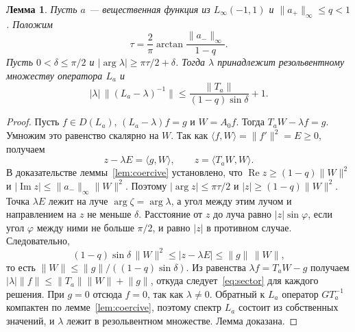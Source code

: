 \documentclass[12pt,a4paper]{article}
\newtheorem{lemma}{Лемма}
\theoremstyle{definition}
\newcommand{\norm}[1]{\lVert#1\rVert}
\newcommand{\abs}[1]{\lvert#1\rvert}
\newcommand{\inner}[2]{\langle#1,#2\rangle}
\begin{document}
\begin{lemma}\label{lem:sector}
Пусть $a$ --- вещественная функция из $L_\infty(-1,1)$ и $\norm{a_+}_\infty\le q<1$.
Положим
\[
 \tau=\frac2\pi\arctan\frac{\norm{a_-}_\infty}{1-q}.
\]
Пусть $0<\delta\le\pi/2$ и $\abs{\arg\lambda}\ge\pi\tau/2+\delta$. Тогда $\lambda$
принадлежит резольвентному множеству оператора $L_a$ и
\begin{equation}\label{eq:sector}
 \abs\lambda\,\norm{(L_a-\lambda)^{-1}}\le\frac{\norm{T_a}}{(1-q)\sin\delta}+1 .
\end{equation}
\end{lemma}
\begin{proof}
Пусть $f\in D(L_a)$, $(L_a-\lambda)f=g$ и $W=A_0f$. Тогда $T_aW-\lambda f=g$. Умножим это
равенство скалярно на $W$. Так как $\inner fW=\norm{f'}^2=E\ge0$, получаем
\[
 z-\lambda E=\inner gW,\qquad z=\inner{T_aW}{W}.
\]
В доказательстве леммы~\ref{lem:coercive} установлено, что
$\operatorname{Re}z\ge(1-q)\norm W^2$ и
$\abs{\operatorname{Im}z}\le\norm{a_-}_\infty\norm W^2$. Поэтому
$\abs{\arg z}\le\pi\tau/2$ и $\abs z\ge(1-q)\norm W^2$. Точка $\lambda E$ лежит на луче
$\arg\zeta=\arg\lambda$, а угол между этим лучом и направлением на $z$ не меньше $\delta$.
Расстояние от $z$ до луча равно $\abs z\sin\varphi$, если угол $\varphi$ между ними не
больше $\pi/2$, и равно $\abs z$ в противном случае. Следовательно,
\[
 (1-q)\sin\delta\,\norm W^2\le\abs{z-\lambda E}\le\norm g\,\norm W,
\]
то есть $\norm W\le\norm g/((1-q)\sin\delta)$. Из равенства $\lambda f=T_aW-g$ получаем
$\abs\lambda\norm f\le\norm{T_a}\norm W+\norm g$, откуда следует~\eqref{eq:sector} для
каждого решения. При $g=0$ отсюда $f=0$, так как $\lambda\ne0$. Обратный к $L_a$ оператор
$GT_a^{-1}$ компактен по лемме~\ref{lem:coercive}, поэтому спектр $L_a$ состоит из
собственных значений, и $\lambda$ лежит в резольвентном множестве. Лемма доказана.
\end{proof}
\end{document}
